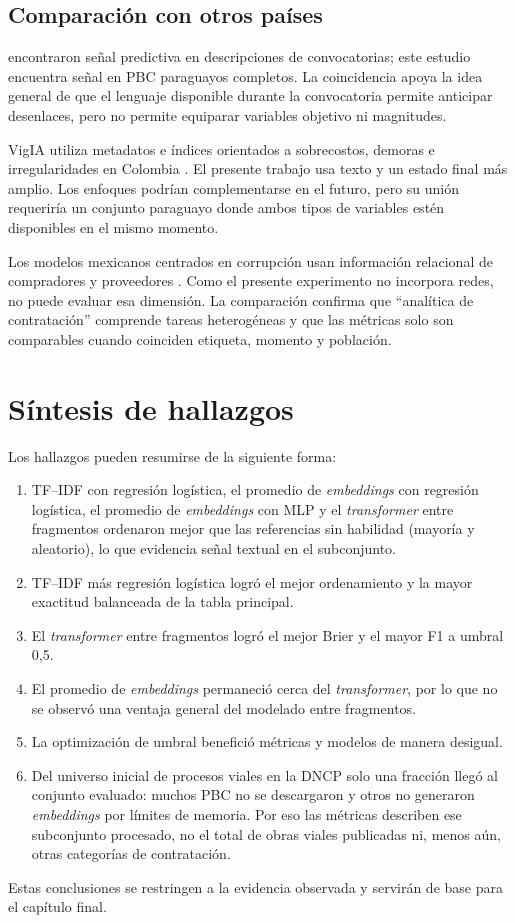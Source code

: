 \subsection{Comparación con otros países}

\textcite{acikalin2024procurementcalls} encontraron señal predictiva en descripciones de convocatorias; este estudio encuentra señal en PBC paraguayos completos. La coincidencia apoya la idea general de que el lenguaje disponible durante la convocatoria permite anticipar desenlaces, pero no permite equiparar variables objetivo ni magnitudes.

VigIA utiliza metadatos e índices orientados a sobrecostos, demoras e irregularidades en Colombia \parencite{salazar2024vigia}. El presente trabajo usa texto y un estado final más amplio. Los enfoques podrían complementarse en el futuro, pero su unión requeriría un conjunto paraguayo donde ambos tipos de variables estén disponibles en el mismo momento.

Los modelos mexicanos centrados en corrupción usan información relacional de compradores y proveedores \parencite{aldana2022mexico}. Como el presente experimento no incorpora redes, no puede evaluar esa dimensión. La comparación confirma que ``analítica de contratación'' comprende tareas heterogéneas y que las métricas solo son comparables cuando coinciden etiqueta, momento y población.

\section{Síntesis de hallazgos}

Los hallazgos pueden resumirse de la siguiente forma:

\begin{enumerate}
  \item TF--IDF con regresión logística, el promedio de \textit{embeddings} con regresión logística, el promedio de \textit{embeddings} con MLP y el \textit{transformer} entre fragmentos ordenaron mejor que las referencias sin habilidad (mayoría y aleatorio), lo que evidencia señal textual en el subconjunto.
  \item TF--IDF más regresión logística logró el mejor ordenamiento y la mayor exactitud balanceada de la tabla principal.
  \item El \textit{transformer} entre fragmentos logró el mejor Brier y el mayor F1 a umbral 0,5.
  \item El promedio de \textit{embeddings} permaneció cerca del \textit{transformer}, por lo que no se observó una ventaja general del modelado entre fragmentos.
  \item La optimización de umbral benefició métricas y modelos de manera desigual.
  \item Del universo inicial de procesos viales en la DNCP solo una fracción llegó al conjunto evaluado: muchos PBC no se descargaron y otros no generaron \textit{embeddings} por límites de memoria. Por eso las métricas describen ese subconjunto procesado, no el total de obras viales publicadas ni, menos aún, otras categorías de contratación.
\end{enumerate}

Estas conclusiones se restringen a la evidencia observada y servirán de base para el capítulo final.
